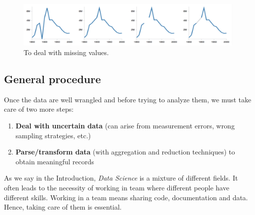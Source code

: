 \begin{figure}[H]%
 \centering
 \includegraphics[width=15cm]{./img/03/missing_values}
 \caption{\label{miss_val}To deal with missing values.}
\end{figure}

\subsection{General procedure}

Once the data are well wrangled and before trying to analyze them, we must take care of two more steps:

\begin{enumerate}
  \item \textbf{Deal with uncertain data} (can arise from measurement errors, wrong sampling strategies, etc.)
  \item \textbf{Parse/transform data} (with aggregation and reduction techniques) to obtain meaningful records
\end{enumerate}
 
As we say in the Introduction, \emph{Data Science} is a mixture of different fields. It often leads to the necessity of working in team where different people have different skills. Working in a team means sharing code, documentation and data. Hence, taking care of them is essential.

\clearpage


 